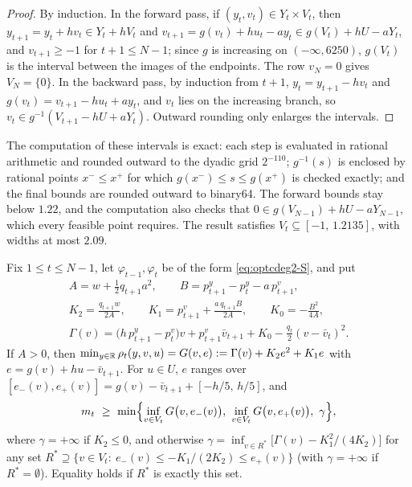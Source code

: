 \begin{proof}
By induction.
In the forward pass, if $(y_t,v_t)\in Y_t\times V_t$, then $y_{t+1}=y_t+hv_t\in Y_t+hV_t$ and $v_{t+1}=g(v_t)+hu_t-ay_t\in g(V_t)+hU-aY_t$, and $v_{t+1}\ge-1$ for $t+1\le N-1$; since $g$ is increasing on $(-\infty,6250)$, $g(V_t)$ is the interval between the images of the endpoints.
The row $v_N=0$ gives $V_N=\{0\}$.
In the backward pass, by induction from $t+1$, $y_t=y_{t+1}-hv_t$ and $g(v_t)=v_{t+1}-hu_t+ay_t$, and $v_t$ lies on the increasing branch, so $v_t\in g^{-1}(V_{t+1}-hU+aY_t)$.
Outward rounding only enlarges the intervals.
\end{proof}

The computation of these intervals is exact: each step is evaluated in rational arithmetic and rounded outward to the dyadic grid $2^{-110}$; $g^{-1}(s)$ is enclosed by rational points $x^-\le x^+$ for which $g(x^-)\le s\le g(x^+)$ is checked exactly; and the final bounds are rounded outward to binary64.
The forward bounds stay below $1.22$, and the computation also checks that $0\in g(V_{N-1})+hU-aY_{N-1}$, which every feasible point requires.
The result satisfies $V_t\subseteq[-1,\,1.2135]$, with widths at most $2.09$.

\begin{lemma}\label{lem:optcdeg2-stage}
Fix $1\le t\le N-1$, let $\varphi_{t-1},\varphi_t$ be of the form \eqref{eq:optcdeg2-S}, and put
\begin{gather*}
A=w+\tfrac12q_{t+1}a^2,\qquad B=p^y_{t+1}-p^y_t-a\,p^v_{t+1},\\
K_2=\frac{q_{t+1}w}{2A},\qquad K_1=p^v_{t+1}+\frac{a\,q_{t+1}B}{2A},\qquad K_0=-\frac{B^2}{4A},\\
\Gamma(v)=\bigl(h\,p^y_{t+1}-p^v_t\bigr)v+p^v_{t+1}\bar v_{t+1}+K_0-\frac{q_t}2(v-\bar v_t)^2 .
\end{gather*}
If $A>0$, then $\min_{y\in\mathbb{R}}\rho_t(y,v,u)=G(v,e):=\Gamma(v)+K_2e^2+K_1e$ with $e=g(v)+hu-\bar v_{t+1}$.
For $u\in U$, $e$ ranges over $[e_-(v),e_+(v)]=g(v)-\bar v_{t+1}+[-h/5,\,h/5]$, and
\[
m_t\ \ge\ \min\Bigl\{\inf_{v\in V_t}G\bigl(v,e_-(v)\bigr),\ \inf_{v\in V_t}G\bigl(v,e_+(v)\bigr),\ \gamma\Bigr\},
\]
where $\gamma=+\infty$ if $K_2\le0$, and otherwise $\gamma=\inf_{v\in R^*}\bigl[\Gamma(v)-K_1^2/(4K_2)\bigr]$ for any set $R^*\supseteq\{v\in V_t:\ e_-(v)\le-K_1/(2K_2)\le e_+(v)\}$ (with $\gamma=+\infty$ if $R^*=\emptyset$).
Equality holds if $R^*$ is exactly this set.
\end{lemma}

